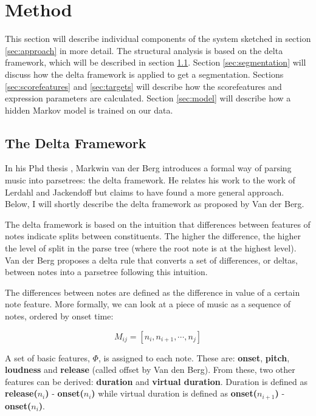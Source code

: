 \documentclass[a4paper,10pt]{article}
\begin{document}
\section{Method}
\label{sec:method}

This section will describe individual components of the system sketched in section \ref{sec:approach} in more detail. The structural analysis is based on the delta framework, which will be described in section \ref{sec:deltaframework}.  Section \ref{sec:segmentation} will discuss how the delta framework is applied to get a segmentation. Sections \ref{sec:scorefeatures} and \ref{sec:targets} will describe how the scorefeatures and expression parameters are calculated. Section \ref{sec:model} will describe how a hidden Markov model is trained on our data.

\subsection{The Delta Framework}
\label{sec:deltaframework}

In his Phd thesis \cite{markwin}, Markwin van der Berg introduces a formal way of parsing music into parsetrees: the delta framework. He relates his work to the work of Lerdahl and Jackendoff \cite{lerdahl1996generative} but claims to have found a more general approach. Below, I will shortly describe the delta framework as proposed by Van der Berg.

The delta framework is based on the intuition that differences between features of notes indicate splits between constituents. The higher the difference, the higher the level of split in the parse tree (where the root note is at the highest level). Van der Berg proposes a delta rule that converts a set of differences, or deltas, between notes into a parsetree following this intuition. 

The differences between notes are defined as the difference in value of a certain note feature. More formally, we can look at a piece of music as a sequence of notes, ordered by onset time:

\[M_{ij} = [n_i, n_{i+1}, \cdots, n_j]\]

A set of basic features, $\Phi$, is assigned to each note. These are: \textbf{onset}, \textbf{pitch}, \textbf{loudness} and \textbf{release} (called offset by Van den Berg). From these, two other features can be derived: \textbf{duration} and \textbf{virtual duration}. Duration is defined as \textbf{release($n_i$)} - \textbf{onset($n_i$)} while virtual duration is defined as \textbf{onset($n_{i+1}$)} - \textbf{onset($n_i$)}. 
\end{document}

